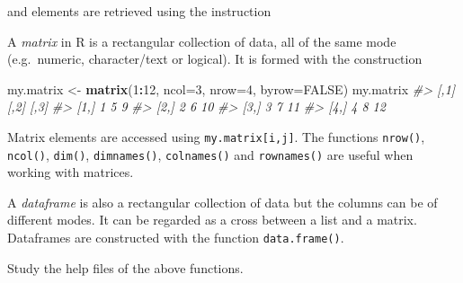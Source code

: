 \documentclass[
]{book}
\newenvironment{Shaded}{\begin{snugshade}}{\end{snugshade}}
\newcommand{\AttributeTok}[1]{\textcolor[rgb]{0.13,0.29,0.53}{#1}}
\newcommand{\CommentTok}[1]{\textcolor[rgb]{0.56,0.35,0.01}{\textit{#1}}}
\newcommand{\ConstantTok}[1]{\textcolor[rgb]{0.56,0.35,0.01}{#1}}
\newcommand{\DecValTok}[1]{\textcolor[rgb]{0.00,0.00,0.81}{#1}}
\newcommand{\FunctionTok}[1]{\textcolor[rgb]{0.13,0.29,0.53}{\textbf{#1}}}
\newcommand{\NormalTok}[1]{#1}
\newcommand{\OtherTok}[1]{\textcolor[rgb]{0.56,0.35,0.01}{#1}}
\newcommand{\SpecialCharTok}[1]{\textcolor[rgb]{0.81,0.36,0.00}{\textbf{#1}}}
\begin{document}
and elements are retrieved using the instruction

\begin{Shaded}
\end{Shaded}

A \emph{{matrix}} in R is a rectangular collection of data, all of the same mode (e.g.~numeric, character/text or logical). It is formed with the construction

\begin{Shaded}
\begin{Highlighting}[]
\NormalTok{my.matrix }\OtherTok{\textless{}{-}} \FunctionTok{matrix}\NormalTok{(}\DecValTok{1}\SpecialCharTok{:}\DecValTok{12}\NormalTok{, }\AttributeTok{ncol=}\DecValTok{3}\NormalTok{, }\AttributeTok{nrow=}\DecValTok{4}\NormalTok{, }\AttributeTok{byrow=}\ConstantTok{FALSE}\NormalTok{)}
\NormalTok{my.matrix}
\CommentTok{\#\textgreater{}      [,1] [,2] [,3]}
\CommentTok{\#\textgreater{} [1,]    1    5    9}
\CommentTok{\#\textgreater{} [2,]    2    6   10}
\CommentTok{\#\textgreater{} [3,]    3    7   11}
\CommentTok{\#\textgreater{} [4,]    4    8   12}
\end{Highlighting}
\end{Shaded}

Matrix elements are accessed using \texttt{my.matrix{[}i,j{]}}. The functions \texttt{nrow()}, \texttt{ncol()}, \texttt{dim()}, \texttt{dimnames()}, \texttt{colnames()} and \texttt{rownames()} are useful when working with matrices.

A \emph{{dataframe}} is also a rectangular collection of data but the columns can be of different modes. It can be regarded as a cross between a list and a matrix. Dataframes are constructed with the function \texttt{data.frame()}.

Study the help files of the above functions.
\end{document}
